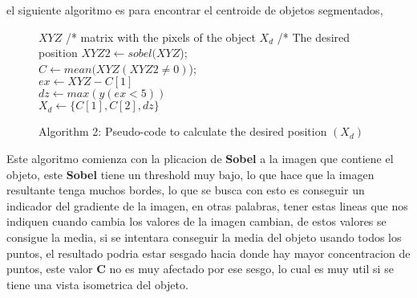     el siguiente algoritmo es para encontrar el centroide de objetos segmentados,
    
    
    \begin{figure}[h]
    	\begin{algorithmic}[h]
    		\REQUIRE $XYZ$ /* matrix with the pixels of the object
    		\ENSURE	$X_d$	/* The desired position
    		\STATE $XYZ2 \leftarrow sobel(XYZ$);\\
    		$C \leftarrow mean(XYZ(XYZ2\neq0)$);\\
    		\STATE $ex \leftarrow XYZ-C[1]$\\
    		$dz\leftarrow max(y(ex<5))$\\					
    		$X_d \leftarrow \{C[1], C[2], dz\}$
    	\end{algorithmic}
    	\caption{Algorithm 2: Pseudo-code to calculate the desired position $(X_d)$}
    	\label{alg2}
    \end{figure}
    
    Este algoritmo comienza con la plicacion de \textbf{Sobel} a la imagen que contiene el objeto, este \textbf{Sobel} tiene un threshold muy bajo, lo que hace que la imagen resultante tenga muchos bordes, lo que se busca con esto es conseguir un indicador del gradiente de la imagen, en otras palabras, tener estas lineas que nos indiquen cuando cambia los valores de la imagen cambian, de estos valores se consigue la media, si se intentara conseguir la media del objeto usando todos los puntos, el resultado podria estar sesgado hacia donde hay mayor concentracion de puntos, este valor \textbf{C} no es muy afectado por ese sesgo, lo cual es muy util si se tiene una vista isometrica del objeto.
    
